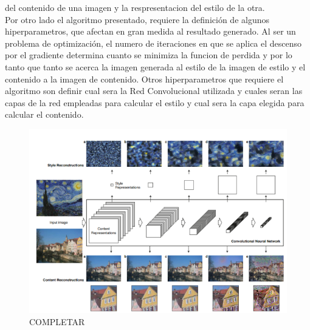 \documentclass[a4paper,11pt,spanish]{book}
\begin{document}
      del contenido de una imagen y la respresentacion del estilo de la otra.\\
      Por otro lado el algoritmo presentado, requiere la definición de algunos hiperparametros, que afectan en gran medida al resultado generado.
      Al ser un problema de optimización, el numero de iteraciones en que se aplica el descenso por el gradiente determina cuanto se minimiza la funcion de perdida
      y por lo tanto que tanto se acerca la imagen generada al estilo de la imagen de estilo y el contenido a la imagen de contenido.
      Otros hiperparametros que requiere el algoritmo son definir cual sera la Red Convolucional utilizada y cuales seran las capas de la red empleadas para calcular el estilo y cual sera la capa elegida
      para calcular el contenido.
      	  \begin{figure}[h]
	    \includegraphics[width=\linewidth]{./img/gatys_1.png}
	    \caption{COMPLETAR}
	    \label{fig:gatys_1}
	  \end{figure}
\end{document}
